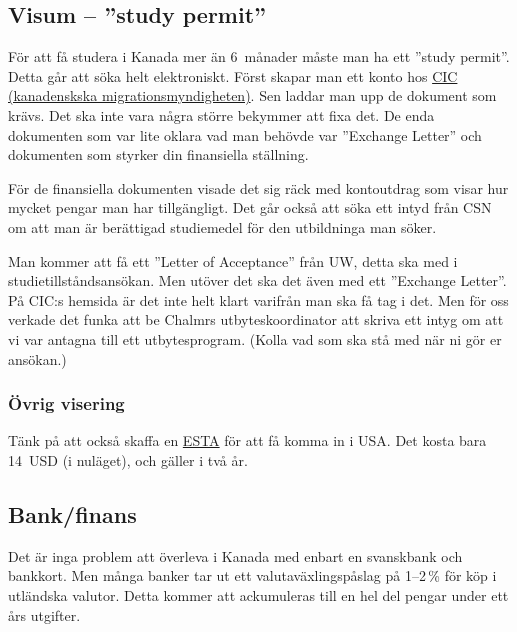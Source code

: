 \documentclass[11pt,a4paper, english, swedish]{article}
\begin{document}
\subsection{Visum -- ''study permit''}
För att få studera i Kanada mer än 6~månader måste man ha ett ''study
permit''. Detta går att söka helt elektroniskt. Först skapar man ett
konto hos
\href{http://www.cic.gc.ca/english/information/applications/student.asp}{CIC
(kanadenskska migrationsmyndigheten)}. Sen laddar man upp de dokument
som krävs. Det ska inte vara några större bekymmer att fixa det.
De enda dokumenten som var lite oklara vad man behövde var ''Exchange
Letter'' och dokumenten som styrker din finansiella ställning.

För de finansiella dokumenten visade det sig räck med kontoutdrag som
visar hur mycket pengar man har tillgängligt. Det går också att söka
ett intyd från CSN om att man är berättigad studiemedel för den
utbildninga man söker. 

Man kommer att få ett ''Letter of Acceptance'' från UW, detta ska med
i studietillståndsansökan. Men utöver det ska det även med ett
''Exchange Letter''. På CIC:s hemsida är det inte helt klart varifrån
man ska få tag i det. Men för oss verkade det funka att be Chalmrs
utbyteskoordinator\footnotemark{} att skriva ett intyg om att vi var
antagna till ett utbytesprogram. (Kolla vad som ska stå med när ni gör
er ansökan.) 

\subsubsection{Övrig visering}
Tänk på att också skaffa en
\href{http://www.esta.us/sweden.html}{ESTA} för att få komma in i
USA. Det kosta bara 14~USD (i nuläget), och gäller i två år.


\subsection{Bank/finans}
Det är inga problem att överleva i Kanada med enbart en svanskbank och
bankkort. Men många banker tar ut ett valutaväxlingspåslag på 1--2\,\%
för köp i utländska valutor. Detta kommer att ackumuleras till en hel del
pengar under ett års utgifter. 
\end{document}

